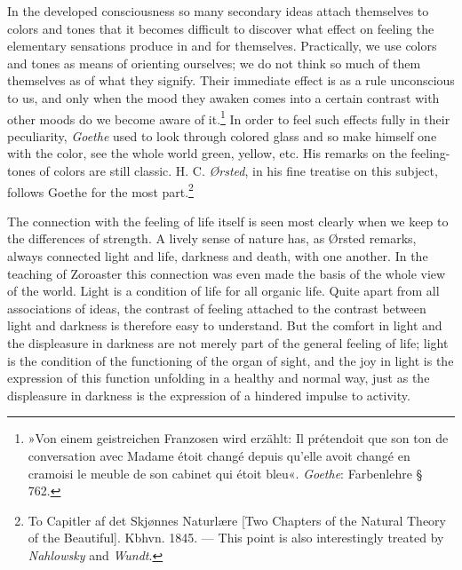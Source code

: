 \documentclass[12pt,a4paper]{book}
\newcommand{\opage}[1]{\marginnote{\footnotesize\textit{[#1]}}}
\begin{document}
In the developed consciousness so many secondary ideas attach themselves
to colors and tones that it becomes difficult to discover what effect on
feeling the elementary sensations produce in and for themselves.
Practically, we use colors and tones as means of orienting ourselves; we
do not think so much of them themselves as of what they signify. Their
immediate effect is as a rule unconscious to us, and only when the mood
they awaken comes into a certain contrast with other moods do we become
aware of it.\footnote{»Von einem geistreichen Franzosen wird erzählt: Il
prétendoit que son ton de conversation avec Madame étoit changé depuis
qu'elle avoit changé en cramoisi le meuble de son cabinet qui étoit
bleu«. \emph{Goethe}: Farbenlehre § 762.} In order to feel such effects
fully in their peculiarity, \emph{Goethe} used to look through colored
glass and so make himself one with the color, see the whole world green,
yellow, etc. His remarks on the feeling-tones of colors are still
classic. H. C. \emph{Ørsted}, in his fine treatise on this subject,
follows Goethe for the most part.\footnote{To Capitler af det Skjønnes
Naturlære [Two Chapters of the Natural Theory of the Beautiful]. Kbhvn.
1845. --- This point is also interestingly treated by \emph{Nahlowsky}
and \emph{Wundt}.}

The connection with the feeling of life itself is seen most clearly when
we keep to the differences of strength. A lively sense of nature has, as
Ørsted remarks, always connected light and life, darkness and death,
with one another. In the teaching of Zoroaster this connection was even
made the basis of the whole view of the world. Light is a condition of
life for all organic life. Quite apart from all associations of ideas,
the contrast of feeling attached to the contrast between light and
darkness is therefore
\opage{278}easy to understand. But the comfort in light and the
displeasure in darkness are not merely part of the general feeling of
life; light is the condition of the functioning of the organ of sight,
and the joy in light is the expression of this function unfolding in a
healthy and normal way, just as the displeasure in darkness is the
expression of a hindered impulse to activity.
\end{document}
